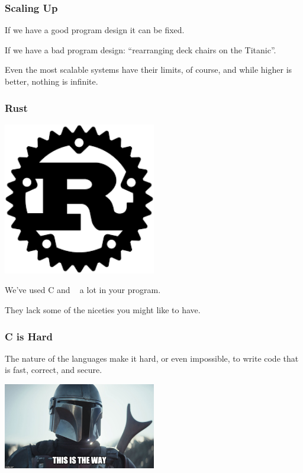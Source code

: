 \begin{frame}
\frametitle{Scaling Up}

If we have a good program design it can be fixed. 

If we have a bad program design: ``rearranging deck chairs on the Titanic''.

Even the most scalable systems have their limits, of course, and while higher is better, nothing is infinite.

\end{frame}

\begin{frame}
\frametitle{Rust}

\begin{center}
	\includegraphics[width=0.5\textwidth]{images/Rust.png}
\end{center}

We've used C and \CPP~ a lot in your program.

They lack some of the niceties you might like to have.

\end{frame}


\begin{frame}
\frametitle{C is Hard}

The nature of the languages make it hard, or even impossible, to write code that is fast, correct, and secure. 

\begin{center}
	\includegraphics[width=0.5\textwidth]{images/mando.jpg}
\end{center}

\end {frame}

